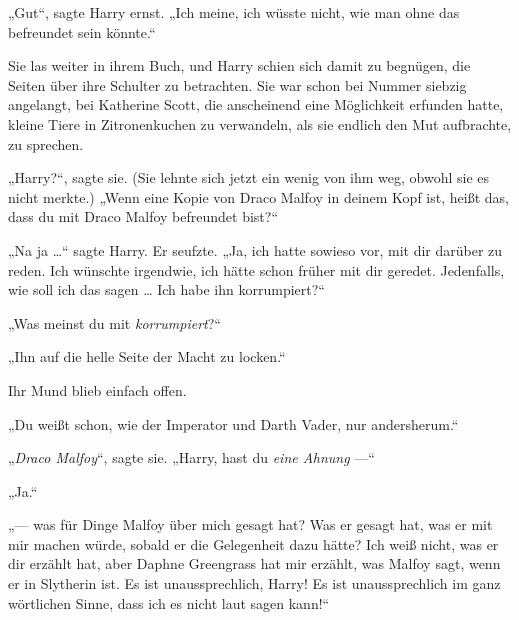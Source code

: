 „Gut“, sagte Harry ernst.
„Ich meine, ich wüsste nicht, wie man ohne das befreundet sein könnte.“


Sie las weiter in ihrem Buch, und Harry schien sich damit zu begnügen, die Seiten über ihre Schulter zu betrachten. Sie war schon bei Nummer siebzig angelangt, bei Katherine Scott, die anscheinend eine Möglichkeit erfunden hatte, kleine Tiere in Zitronenkuchen zu verwandeln, als sie endlich den Mut aufbrachte, zu sprechen.

„Harry?“, sagte sie. (Sie lehnte sich jetzt ein wenig von ihm weg, obwohl sie es nicht merkte.)
„Wenn eine Kopie von Draco Malfoy in deinem Kopf ist, heißt das, dass du mit Draco Malfoy befreundet bist?“

„Na ja …“ sagte Harry. Er seufzte.
„Ja, ich hatte sowieso vor, mit dir darüber zu reden. Ich wünschte irgendwie, ich hätte schon früher mit dir geredet. Jedenfalls, wie soll ich das sagen … Ich habe ihn korrumpiert?“

„Was meinst du mit \emph{korrumpiert}?“

„Ihn auf die helle Seite der Macht zu locken.“

Ihr Mund blieb einfach offen.

„Du weißt schon, wie der Imperator und Darth Vader, nur andersherum.“

„\emph{Draco Malfoy}“, sagte sie.
„Harry, hast du \emph{eine Ahnung} —“

„Ja.“

„— was für Dinge Malfoy über mich gesagt hat? Was er gesagt hat, was er mit mir machen würde, sobald er die Gelegenheit dazu hätte? Ich weiß nicht, was er dir erzählt hat, aber Daphne Greengrass hat mir erzählt, was Malfoy sagt, wenn er in Slytherin ist. Es ist unaussprechlich, Harry! Es ist unaussprechlich im ganz wörtlichen Sinne, dass ich es nicht laut sagen kann!“

